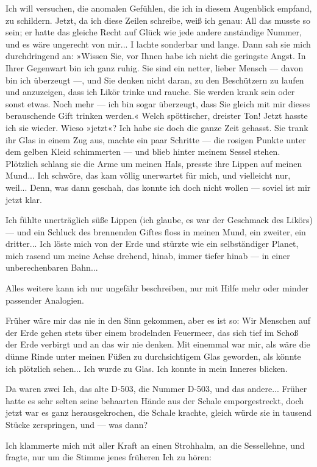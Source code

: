 Ich will versuchen, die anomalen Gefühlen, die ich in diesem
Augenblick empfand, zu schildern. Jetzt, da ich diese Zeilen
schreibe, weiß ich genau: All das musste so sein; er hatte das
gleiche Recht auf Glück wie jede andere anständige Nummer, und es
wäre ungerecht von mir... I lachte sonderbar und lange. Dann sah
sie mich durchdringend an: »Wissen Sie, vor Ihnen habe ich nicht
die geringste Angst. In Ihrer Gegenwart bin ich ganz ruhig. Sie
sind ein netter, lieber Mensch — davon bin ich überzeugt —, und Sie
denken nicht daran, zu den Beschützern zu laufen und anzuzeigen,
dass ich Likör trinke und rauche. Sie werden krank sein oder sonst
etwas. Noch mehr — ich bin sogar überzeugt, dass Sie gleich mit mir
dieses berauschende Gift trinken werden.« Welch spöttischer,
dreister Ton! Jetzt hasste ich sie wieder. Wieso »jetzt«? Ich habe
sie doch die ganze Zeit gehasst. Sie trank ihr Glas in einem Zug
aus, machte ein paar Schritte — die rosigen Punkte unter dem gelben
Kleid schimmerten — und blieb hinter meinem Sessel stehen.
Plötzlich schlang sie die Arme um meinen Hals, presste ihre Lippen
auf meinen Mund... Ich schwöre, das kam völlig unerwartet für mich,
und vielleicht nur, weil... Denn, was dann geschah, das konnte ich
doch nicht wollen — soviel ist mir jetzt klar.

Ich fühlte unerträglich süße Lippen (ich glaube, es war der
Geschmack des Likörs) — und ein Schluck des brennenden Giftes floss
in meinen Mund, ein zweiter, ein dritter... Ich löste mich von der
Erde und stürzte wie ein selbständiger Planet, mich rasend um meine
Achse drehend, hinab, immer tiefer hinab — in einer unberechenbaren
Bahn...

Alles weitere kann ich nur ungefähr beschreiben, nur mit Hilfe mehr
oder minder passender Analogien.

Früher wäre mir das nie in den Sinn gekommen, aber es ist so: Wir
Menschen auf der Erde gehen stets über einem brodelnden Feuermeer,
das sich tief im Schoß der Erde verbirgt und an das wir nie denken.
Mit einemmal war mir, als wäre die dünne Rinde unter meinen Füßen
zu durchsichtigem Glas geworden, als könnte ich plötzlich sehen...
Ich wurde zu Glas. Ich konnte in mein Inneres blicken.

Da waren zwei Ich, das alte D-503, die Nummer D-503, und das
andere... Früher hatte es sehr selten seine behaarten Hände aus der
Schale emporgestreckt, doch jetzt war es ganz herausgekrochen, die
Schale krachte, gleich würde sie in tausend Stücke zerspringen, und
— was dann?

Ich klammerte mich mit aller Kraft an einen Strohhalm, an die
Sessellehne, und fragte, nur um die Stimme jenes früheren Ich zu
hören:

